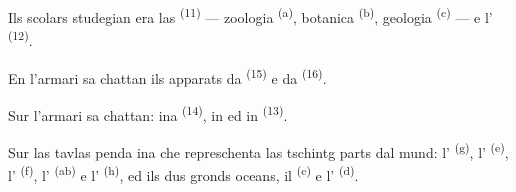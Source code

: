 Ils scolars studegian era las  \textsuperscript{(11)}
--- zoologia \textsuperscript{(a)}, botanica \textsuperscript{(b)}, geologia
\textsuperscript{(c)} --- e l' \textsuperscript{(12)}.

En l'armari sa chattan ils apparats da  \textsuperscript{(15)} e da
 \textsuperscript{(16)}.

Sur l'armari sa chattan: ina  \textsuperscript{(14)}, in
 ed in  \textsuperscript{(13)}.

Sur las tavlas penda ina  che represchenta las tschintg parts dal
mund: l' \textsuperscript{(g)}, l'
\textsuperscript{(e)}, l' \textsuperscript{(f)},
l' \textsuperscript{(ab)} e l'
\textsuperscript{(h)}, ed ils dus gronds oceans, il 
\textsuperscript{(c)} e l' \textsuperscript{(d)}.
\VUsaut{6.0mm}
\VUfilet{22mm}
